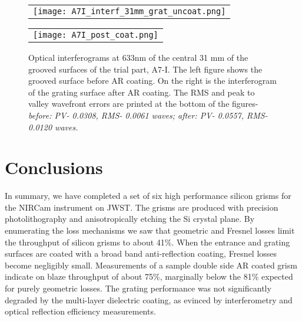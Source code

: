    \begin{figure}
   \begin{minipage}[b]{0.5\linewidth} %
   \begin{center}
   \begin{tabular}{c}
   \texttt{[image: A7I\_interf\_31mm\_grat\_uncoat.png]}
   \end{tabular}
   \end{center}
   \end{minipage}
   \hspace{0.0001cm} %
\begin{minipage}[b]{0.5\linewidth}
\begin{center}
   \begin{tabular}{c}
   \texttt{[image: A7I\_post\_coat.png]}
   \end{tabular}
   \end{center}
   \end{minipage}
   \caption[Trial part groove interferogram] {\label{fig:im6}  Optical interferograms at 633nm of the central 31 mm of the grooved surfaces of the trial part, A7-I.  The left figure shows the grooved surface before AR coating.  On the right is the interferogram of the grating surface after AR coating.  The RMS and peak to valley wavefront errors are printed at the bottom of the figures- \em{before}\em: PV- 0.0308, RMS- 0.0061 waves; \em{after}\em: PV- 0.0557, RMS- 0.0120 waves.}
   \end{figure} 


\section{Conclusions}
In summary, we have completed a set of six high performance silicon grisms for the NIRCam instrument on JWST.  The grisms are produced with precision photolithography and anisotropically etching the Si crystal plane.  By enumerating the loss mechanisms we saw that geometric and Fresnel losses limit the throughput of silicon grisms to about 41\%.  When the entrance and grating surfaces are coated with a broad band anti-reflection coating, Fresnel losses become negligibly small.  Measurements of a sample double side AR coated grism indicate on blaze throughput of about 75\%, marginally below the 81\% expected for purely geometric losses.  The grating performance was not significantly degraded by the multi-layer dielectric coating, as evinced by interferometry and optical reflection efficiency measurements.
